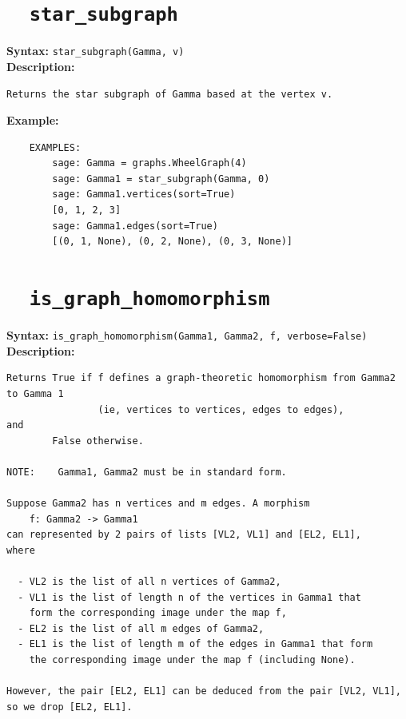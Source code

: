 \documentclass{article}
\begin{document}
\section{\tt \ \ star\_subgraph}

\textbf{Syntax:} \verb}star_subgraph(Gamma, v)}\\

\textbf{Description:}
\begin{verbatim}
Returns the star subgraph of Gamma based at the vertex v.
\end{verbatim}

\textbf{Example:}
\begin{verbatim}
    EXAMPLES:
        sage: Gamma = graphs.WheelGraph(4)
        sage: Gamma1 = star_subgraph(Gamma, 0)
        sage: Gamma1.vertices(sort=True)
        [0, 1, 2, 3]
        sage: Gamma1.edges(sort=True)
        [(0, 1, None), (0, 2, None), (0, 3, None)]
\end{verbatim}

\section{\tt \ \ is\_graph\_homomorphism}

\textbf{Syntax:} \verb}is_graph_homomorphism(Gamma1, Gamma2, f, verbose=False)}\\

\textbf{Description:}
\begin{verbatim}
Returns True if f defines a graph-theoretic homomorphism from Gamma2 to Gamma 1
                (ie, vertices to vertices, edges to edges), 
and 
        False otherwise. 

NOTE:    Gamma1, Gamma2 must be in standard form.

Suppose Gamma2 has n vertices and m edges. A morphism 
    f: Gamma2 -> Gamma1
can represented by 2 pairs of lists [VL2, VL1] and [EL2, EL1],
where 

  - VL2 is the list of all n vertices of Gamma2,
  - VL1 is the list of length n of the vertices in Gamma1 that 
    form the corresponding image under the map f, 
  - EL2 is the list of all m edges of Gamma2,
  - EL1 is the list of length m of the edges in Gamma1 that form 
    the corresponding image under the map f (including None). 
    
However, the pair [EL2, EL1] can be deduced from the pair [VL2, VL1], 
so we drop [EL2, EL1].
\end{verbatim}
\end{document}
